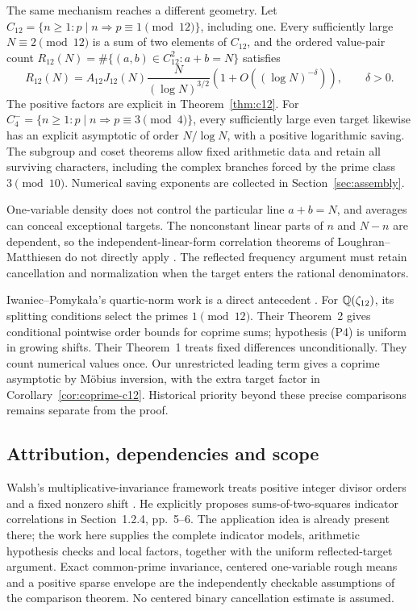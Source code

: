 The same mechanism reaches a different geometry. Let
\(C_{12}=\{n\ge1:p\mid n\Rightarrow p\equiv1\pmod{12}\}\),
including one. Every sufficiently large \(N\equiv2\pmod{12}\)
is a sum of two elements of \(C_{12}\), and
the ordered value-pair count
\(R_{12}(N)=\#\{(a,b)\in C_{12}^2:a+b=N\}\) satisfies
\begin{equation}\label{eq:opening}
 R_{12}(N)=A_{12}J_{12}(N)\frac{N}{(\log N)^{3/2}}
                  \left(1+O((\log N)^{-\delta})\right),
 \qquad\delta>0.
\end{equation}
The positive factors are explicit in Theorem~\ref{thm:c12}.
For \(C^-_4=\{n\ge1:p\mid n\Rightarrow p\equiv3\pmod4\}\),
every sufficiently large even target likewise has an explicit
asymptotic of order \(N/\log N\), with a positive logarithmic saving.
The subgroup and coset theorems allow fixed arithmetic data and retain
all surviving characters, including the complex branches forced by
the prime class \(3\pmod{10}\). Numerical saving exponents are
collected in Section~\ref{sec:assembly}.

One-variable density does not control the particular line \(a+b=N\),
and averages can conceal exceptional targets. The nonconstant linear
parts of \(n\) and \(N-n\) are dependent, so the independent-linear-form
correlation theorems of Loughran--Matthiesen do not directly apply
\cite[Theorems 1.9 and 3.10]{loughranmatthiesen}.
The reflected frequency argument must retain cancellation and
normalization when the target enters the rational denominators.

Iwaniec--Pomyka\l a's quartic-norm work is a direct antecedent
\cite{iwaniecpomykala}. For \(\mathbb Q(\zeta_{12})\), its splitting conditions
select the primes \(1\pmod{12}\). Their Theorem~2 gives conditional
pointwise order bounds for coprime sums; hypothesis (P4) is uniform
in growing shifts. Their Theorem~1 treats fixed differences
unconditionally. They count numerical values once.
Our unrestricted leading term gives a coprime asymptotic by M\"obius
inversion, with the extra target factor in
Corollary~\ref{cor:coprime-c12}. Historical priority beyond these
precise comparisons remains separate from the proof.

\subsection{Attribution, dependencies and scope}

Walsh's multiplicative-invariance framework treats positive integer
divisor orders and a fixed nonzero shift \cite{walsh}.
He explicitly proposes sums-of-two-squares indicator correlations
in Section~1.2.4, pp.~5--6. The application idea is already present
there; the work here supplies the complete indicator models,
arithmetic hypothesis checks and local factors, together with the
uniform reflected-target argument. Exact common-prime invariance,
centered one-variable rough means and a positive sparse envelope are
the independently checkable assumptions of the comparison theorem.
No centered binary cancellation estimate is assumed.

